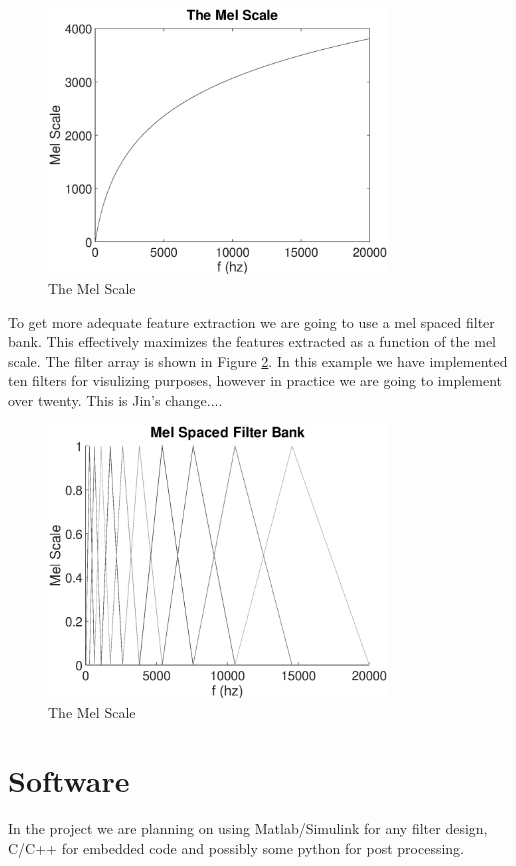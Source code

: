 \documentclass[12pt,journal,compsoc]{IEEEtran}
\begin{document}
\begin{figure}[h]
\includegraphics[width=9cm]{mel.eps}
\caption{The Mel Scale}
\label{mel}
\end{figure}

To get more adequate feature extraction we are going to use a mel spaced filter bank. This effectively maximizes the features extracted as a function of the mel scale. The filter array is shown in Figure \ref{FA}. In this example we have implemented ten filters for visulizing purposes, however in practice we are going to implement over twenty. This is Jin's change....

\begin{figure}[h]
\includegraphics[width=9cm]{FA.eps}
\caption{The Mel Scale}
\label{FA}
\end{figure}


\section{Software}
In the project we are planning on using Matlab/Simulink for any filter design, C/C++ for embedded code and possibly some python for post processing.
\end{document}

